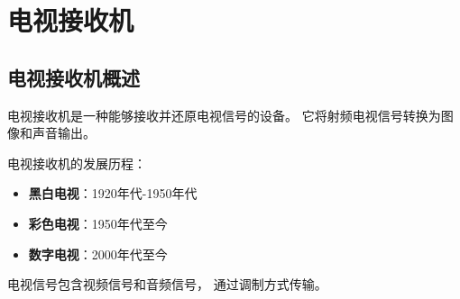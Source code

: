 
\chapter{电视接收机}
\label{chap:television_receiver}

\section{电视接收机概述}
\label{sec:tv_receiver_intro}

电视接收机是一种能够接收并还原电视信号的设备。
它将射频电视信号转换为图像和声音输出。

电视接收机的发展历程：
\begin{itemize}
    \item \textbf{黑白电视}：1920年代-1950年代
    \item \textbf{彩色电视}：1950年代至今
    \item \textbf{数字电视}：2000年代至今
\end{itemize}

电视信号包含视频信号和音频信号，
通过调制方式传输。

